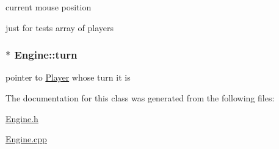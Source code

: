 current mouse position 

just for tests array of players \hypertarget{class_engine_a747d5223870d541667213e307cc34d04}{}
\subsubsection[{turn}]{$\ast$ Engine\+::turn\hspace{0.3cm}{\ttfamily [private]}}\label{class_engine_a747d5223870d541667213e307cc34d04}


pointer to \hyperlink{class_player}{Player} whose turn it is 



The documentation for this class was generated from the following files\+:\begin{DoxyCompactItemize}
\item 
\hyperlink{_engine_8h}{Engine.\+h}\item 
\hyperlink{_engine_8cpp}{Engine.\+cpp}\end{DoxyCompactItemize}
